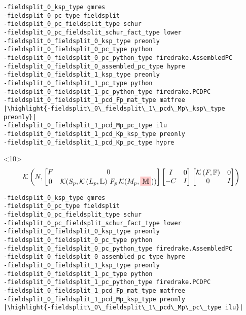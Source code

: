 \documentclass[presentation]{beamer}
\newcommand{\KSP}[2]{\ensuremath{\mathcal{K}\left(#1, \mathbb{#2}\right)}}
\newcommand{\ksp}[1]{\KSP{#1}{#1}}
\newcommand{\highlight}[1]{\colorbox{red!20}{\color{black} #1}}
\begin{document}
\begin{frame}[fragile]
\begin{onlyenv}
\begin{verbatim}
-fieldsplit_0_ksp_type gmres
-fieldsplit_0_pc_type fieldsplit
-fieldsplit_0_pc_fieldsplit_type schur
-fieldsplit_0_pc_fieldsplit_schur_fact_type lower
-fieldsplit_0_fieldsplit_0_ksp_type preonly
-fieldsplit_0_fieldsplit_0_pc_type python
-fieldsplit_0_fieldsplit_0_pc_python_type firedrake.AssembledPC
-fieldsplit_0_fieldsplit_0_assembled_pc_type hypre
-fieldsplit_0_fieldsplit_1_ksp_type preonly
-fieldsplit_0_fieldsplit_1_pc_type python
-fieldsplit_0_fieldsplit_1_pc_python_type firedrake.PCDPC
-fieldsplit_0_fieldsplit_1_pcd_Fp_mat_type matfree
|\highlight{-fieldsplit\_0\_fieldsplit\_1\_pcd\_Mp\_ksp\_type preonly}|
-fieldsplit_0_fieldsplit_1_pcd_Mp_pc_type ilu
-fieldsplit_0_fieldsplit_1_pcd_Kp_ksp_type preonly
-fieldsplit_0_fieldsplit_1_pcd_Kp_pc_type hypre
\end{verbatim}
  \end{onlyenv}
  \begin{onlyenv}<10>
    \color{gray}
    \begin{equation*}
      \KSP{N}{%
        \begin{bmatrix}
        F & 0 \\
        0 & \mathcal{K}(S_p, \KSP{L_p}{L}\,F_p \, \mathcal{K}(M_p, \highlight{$\mathbb{M}$}))
      \end{bmatrix}
      \begin{bmatrix}
        I & 0\\
        -C & I
      \end{bmatrix}
      \begin{bmatrix}
        \ksp{F} & 0 \\
        0 & I
      \end{bmatrix}}
    \end{equation*}
\begin{verbatim}
-fieldsplit_0_ksp_type gmres
-fieldsplit_0_pc_type fieldsplit
-fieldsplit_0_pc_fieldsplit_type schur
-fieldsplit_0_pc_fieldsplit_schur_fact_type lower
-fieldsplit_0_fieldsplit_0_ksp_type preonly
-fieldsplit_0_fieldsplit_0_pc_type python
-fieldsplit_0_fieldsplit_0_pc_python_type firedrake.AssembledPC
-fieldsplit_0_fieldsplit_0_assembled_pc_type hypre
-fieldsplit_0_fieldsplit_1_ksp_type preonly
-fieldsplit_0_fieldsplit_1_pc_type python
-fieldsplit_0_fieldsplit_1_pc_python_type firedrake.PCDPC
-fieldsplit_0_fieldsplit_1_pcd_Fp_mat_type matfree
-fieldsplit_0_fieldsplit_1_pcd_Mp_ksp_type preonly
|\highlight{-fieldsplit\_0\_fieldsplit\_1\_pcd\_Mp\_pc\_type ilu}|

\end{verbatim}
\end{onlyenv}
\end{frame}
\end{document}
